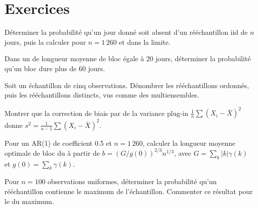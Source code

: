 \section{Exercices}

\begin{exercise}[$\star$]\label{exo:qm:resampling:1}
Déterminer la probabilité qu'un jour donné soit absent d'un rééchantillon  iid de $n$ jours, puis la calculer pour $n = 1\,260$ et
dans la limite.
\end{exercise}

\begin{exercise}[$\star$]\label{exo:qm:resampling:2}
Dans un  de longueur moyenne de bloc égale à 20 jours, déterminer la probabilité qu'un bloc dure plus de 60 jours.
\end{exercise}

\begin{exercise}[$\star$]\label{exo:qm:resampling:3}
Soit un échantillon de cinq observations. Dénombrer les rééchantillons  ordonnés, puis les rééchantillons distincts, vus comme des multiensembles.
\end{exercise}

\begin{exercise}[$\star\star$]\label{exo:qm:resampling:4}
Montrer que la correction de biais par  de la variance plug-in $\frac1n\sum(X_i - \bar X)^2$ donne $s^2 = \frac1{n-1}\sum(X_i - \bar X)^2$.
\end{exercise}

\begin{exercise}[$\star\star$]\label{exo:qm:resampling:5}
Pour un AR(1) de coefficient 0.5 et $n = 1\,260$, calculer la longueur moyenne optimale de bloc du  à partir de $b =
(G/g(0))^{2/3}n^{1/3}$, avec $G = \sum_k|k|\gamma(k)$ et $g(0) = \sum_k\gamma(k)$.
\end{exercise}

\begin{exercise}[$\star\star$]\label{exo:qm:resampling:6}
Pour $n = 100$ observations uniformes, déterminer la probabilité qu'un rééchantillon  contienne le maximum de l'échantillon. Commenter
ce résultat pour le  du maximum.
\end{exercise}


